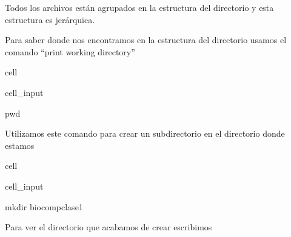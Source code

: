 \documentclass[letterpaper,10pt,english]{jupyterBook}
\begin{document}
\begin{DUlineblock}{0em}
\item[] 
\end{DUlineblock}

\sphinxAtStartPar
Todos los archivos están  agrupados en la estructura del directorio y esta estructura es jerárquica.



\sphinxAtStartPar
Para saber donde nos encontramos en la estructura del directorio usamos el comando “print working directory”

\begin{sphinxuseclass}{cell}\begin{sphinxVerbatimInput}

\begin{sphinxuseclass}{cell_input}
\begin{sphinxVerbatim}[commandchars=\\\{\}]
\PYGZdl{} pwd
\end{sphinxVerbatim}

\end{sphinxuseclass}\end{sphinxVerbatimInput}

\end{sphinxuseclass}
\begin{DUlineblock}{0em}
\item[] 
\end{DUlineblock}

\begin{DUlineblock}{0em}
\item[] 
\end{DUlineblock}

\sphinxAtStartPar
Utilizamos este comando para crear un subdirectorio en el directorio donde estamos

\begin{sphinxuseclass}{cell}\begin{sphinxVerbatimInput}

\begin{sphinxuseclass}{cell_input}
\begin{sphinxVerbatim}[commandchars=\\\{\}]
\PYGZdl{} mkdir biocomp\PYGZus{}clase1
\end{sphinxVerbatim}

\end{sphinxuseclass}\end{sphinxVerbatimInput}

\end{sphinxuseclass}
\sphinxAtStartPar
Para ver el directorio que acabamos de crear escribimos
\end{document}
